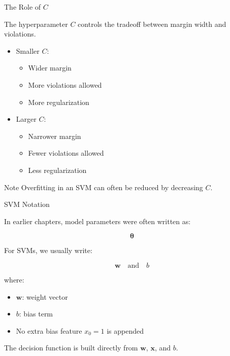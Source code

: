 \documentclass[aspectratio=169]{beamer}
\begin{document}
\begin{frame}{The Role of \(C\)}

The hyperparameter \(C\) controls the tradeoff between margin width and violations.

\vspace{0.75em}

\begin{itemize}
\item Smaller \(C\):
\begin{itemize}
\item Wider margin
\item More violations allowed
\item More regularization
\end{itemize}

\vspace{0.5em}

\item Larger \(C\):
\begin{itemize}
\item Narrower margin
\item Fewer violations allowed
\item Less regularization
\end{itemize}
\end{itemize}

\vspace{0.75em}

\begin{exampleblock}{Note}
Overfitting in an SVM can often be reduced by decreasing \(C\).
\end{exampleblock}

\end{frame}


\begin{frame}{SVM Notation}

In earlier chapters, model parameters were often written as:

\[
\boldsymbol{\theta}
\]

\vspace{0.5em}

For SVMs, we usually write:

\[
\mathbf{w}
\quad \text{and} \quad
b
\]

\vspace{0.5em}

where:

\begin{itemize}
\item \(\mathbf{w}\): weight vector
\item \(b\): bias term
\item No extra bias feature \(x_0=1\) is appended
\end{itemize}

\vspace{0.5em}

The decision function is built directly from \(\mathbf{w}\), \(\mathbf{x}\), and \(b\).

\end{frame}
\end{document}
